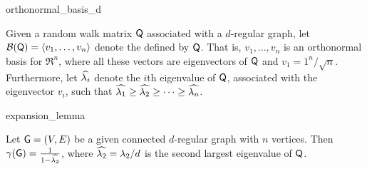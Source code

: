 \begin{fragment}{orthonormal_basis_d}
\begin{defn}
    Given a random walk matrix $\mathsf{Q}$ associated with a $d$-regular
    graph, let $\mathcal{B}(\mathsf{Q})= \left\langle {v_1,\ldots, v_n} \right\rangle$ denote the
     defined by $\mathsf{Q}$. That
    is, $v_1,\ldots, v_n$ is an orthonormal basis for $\Re^n$, where
    all these vectors are eigenvectors of $\mathsf{Q}$ and $v_1=
    1^n/\sqrt{n}$. Furthermore, let $\widehat{\lambda_{i}}$ denote the $i$th
    eigenvalue of $\mathsf{Q}$, associated with the eigenvector $v_i$,
    such that $\widehat{\lambda_{1}} \geq \widehat{\lambda_{2}} \geq \cdots \geq \widehat{\lambda_{n}}$.

\end{defn}
\end{fragment}

\begin{fragment}{expansion_lemma}
\begin{lemma}
    Let $\mathsf{G}=(V,E)$ be a given connected $d$-regular graph with $n$
    vertices. Then $\DialX{\Graph} = \frac{1}{1-\SEVN}$, where
    $\widehat{\lambda_2}=\lambda_2/d$ is the second largest eigenvalue of $\mathsf{Q}$.

\end{lemma}
\end{fragment}

